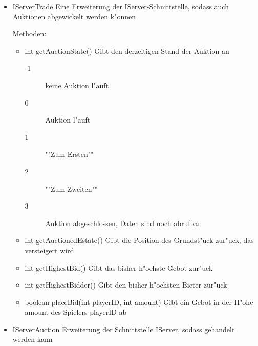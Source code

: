 \documentclass[a4paper,10pt]{article}
\begin{document}
\begin{itemize}
\item IServerTrade
Eine Erweiterung der IServer-Schnittstelle, sodass auch Auktionen abgewickelt werden k"onnen

Methoden:
\begin{itemize}
\item int getAuctionState()
Gibt den derzeitigen Stand der Auktion an
\begin{description}
\item[-1] keine Auktion l"auft
\item[0] Auktion l"auft
\item[1] ""Zum Ersten""
\item[2] ""Zum Zweiten""
\item[3] Auktion abgeschlossen, Daten sind noch abrufbar
\end{description}
\item int getAuctionedEstate()
Gibt die Position des Grundst"uck zur"uck, das versteigert wird
\item int getHighestBid()
Gibt das bisher h"ochste Gebot zur"uck
\item int getHighestBidder()
Gibt den bisher h"ochsten Bieter zur"uck
\item boolean placeBid(int playerID, int amount)
Gibt ein Gebot in der H"ohe amount des Spielers playerID ab
\end{itemize}
\item IServerAuction
Erweiterung der Schnittstelle IServer, sodass gehandelt werden kann


\end{itemize}
\end{document}
